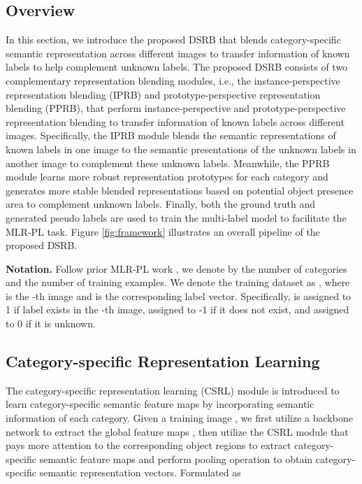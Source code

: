 \documentclass[lettersize,journal]{IEEEtran}
\begin{document}
\subsection{Overview}
In this section, we introduce the proposed DSRB that blends category-specific semantic representation across different images to transfer information of known labels to help complement unknown labels. The proposed DSRB consists of two complementary representation blending modules, i.e., the instance-perspective representation blending (IPRB) and prototype-perspective representation blending (PPRB), that perform instance-perspective and prototype-perspective representation blending to transfer information of known labels across different images. Specifically, the IPRB module blends the semantic representations of known labels in one image to the semantic presentations of the unknown labels in another image to complement these unknown labels. Meanwhile, the PPRB module learns more robust representation prototypes for each category and generates more stable blended representations based on potential object presence area to complement unknown labels. Finally, both the ground truth and generated pseudo labels are used to train the multi-label model to facilitate the MLR-PL task. Figure \ref{fig:framework} illustrates an overall pipeline of the proposed DSRB.

\noindent\textbf{Notation. } Follow prior MLR-PL work \cite{Durand2019CVPR}, we denote by  the number of categories and  the number of training examples. We denote the training dataset as , where  is the -th image and  is the corresponding label vector. Specifically,  is assigned to 1 if label  exists in the -th image, assigned to -1 if it does not exist, and assigned to 0 if it is unknown.

\subsection{Category-specific Representation Learning}
The category-specific representation learning (CSRL) module is introduced to learn category-specific semantic feature maps by incorporating semantic information of each category. Given a training image , we first utilize a backbone network to extract the global feature maps , then utilize the CSRL module that pays more attention to the corresponding object regions to extract category-specific semantic feature maps and perform pooling operation to obtain category-specific semantic representation vectors. Formulated as 
\end{document}
